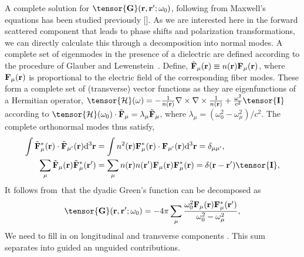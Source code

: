 \documentclass[preprint,aps,pra,onecolumn]{revtex4-1} %
\begin{document}
A complete solution for $\tensor{\mathbf{G}}(\br ,\br' ; \omega_0)$, following from Maxwell's equations 
has been studied previously [].  As we are interested here in the forward scattered component that 
leads to phase shifts and polarization transformations, we can directly calculate this through a 
decomposition into normal modes.  A complete set of eigenmodes in the presence of a dielectric are 
defined according to the procedure of Glauber and Lewenstein~\cite{Glauber1991}.  Define, 
$\tilde{\mathbf{F}}_\mu(\mathbf{r}) \equiv n(\mathbf{r}) \mathbf{F}_\mu (\mathbf{r})$, where $\mathbf{F}_\mu (\mathbf{r})$ is 
proportional to the electric field of the corresponding fiber modes.  These form a complete set of 
(transverse) vector functions as they are eigenfunctions of a Hermitian operator, 
$\tensor{\mathcal{H}}(\omega) = -\frac{1}{n(\br)}
\nabla\times\nabla\times \frac{1}{n(\br)} + \frac{\omega^2}{c^2} \tensor{\mathbf{I}}$ according to 
$\tensor{\mathcal{H}}(\omega_0) \cdot \tilde{\mathbf{F}}_\mu = \lambda_\mu \tilde{\mathbf{F}}_\mu$, where 
$\lambda_\mu=(\omega_0^2-\omega_\mu^2)/c^2$.
The complete orthonormal modes thus satisfy,
\begin{align}
\int \tilde{\mathbf{F}}_\mu^* (\br)\cdot \tilde{\mathbf{F}}_{\mu'}(\br) \mathrm{d}^3\br &= \int n^2(\br) 
\mathbf{F}_\mu^* (\br)\cdot  \mathbf{F}_{\mu'}(\br) 
\mathrm{d}^3\br=\delta_{\mu\mu'},\label{eq:orthutrans}
\\
\sum_\mu \tilde{\mathbf{F}}_\mu (\br) \tilde{\mathbf{F}}_\mu^*(\br') &= \sum_\mu n(\br)n(\br') 
\mathbf{F}_\mu  (\br) \mathbf{F}_\mu^*(\br) =\delta(\br-\br') \tensor{\mathbf{I}}, 
\end{align}
It follows from~\cite{Swedishguys, Wubs}that the dyadic Green's function can be decomposed as
\begin{equation}
\tensor{\mathbf{G}}(\br,\br'; \omega_0) = -4\pi \sum_{\mu} \frac{\omega_0^2\mathbf{F}_\mu (\br) 
\mathbf{F}^*_\mu (\br')}{\omega_0^2-\omega_\mu^2},
\end{equation}
{\color{red}  We need to fill in on longitudinal and transverse components} . This sum separates into guided an unguided contributions. 
\end{document}
